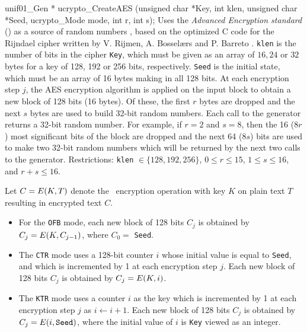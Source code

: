 unif01_Gen * ucrypto_CreateAES (unsigned char *Key, int klen,
                                unsigned char *Seed, ucrypto_Mode mode,
                                int r, int s);
\endcode
\tab Uses the \textit{Advanced Encryption standard} (\aes) as a source of
%
  random numbers \cite{rDAE02a,rNIS01a,rHEL03a,rBAR06a}, based on the optimized
  C code for the Rijndael cipher written by V. Rijmen,
  A. Bossel\ae rs and P. Barreto \cite{rRIJ00a}. \texttt{klen} is the number of
  bits in the cipher \texttt{Key}, which must be given as an array of $16, 24$
  or $32$ bytes for a key of 128, 192 or 256 bits, respectively. \texttt{Seed}
  is the initial state, which must be an array of 16 bytes making in all 128 bits.
  At each encryption step $j$, the AES encryption algorithm is applied on the
  input block to obtain a new block of 128 bits (16 bytes). Of these,
  the first $r$ bytes are dropped and the next $s$ bytes are used to build 32-bit
  random numbers. Each call to the generator returns a 32-bit random number.
  For example, if $r=2$ and $s=8$, then the 16 ($8r$) most significant bits of
  the block are dropped and the next 64 ($8s$) bits are used to make two 32-bit
  random numbers which will be returned by the next two calls to the
  generator. Restrictions: \texttt{klen} $\in \{ 128, 192, 256\}$,
  $0 \le r \le 15$, $1 \le s \le 16$, and  $r + s \le 16$.

  Let $C = {E}(K,T)$ denote the \aes\ encryption operation with key $K$ on
  plain text $T$ resulting in encrypted text $C$.
\begin{itemize}

\item  For the \texttt{OFB} mode, each new block of 128 bits $C_j$ is
  obtained by $C_j = {E}(K,C_{j-1})$, where $C_0 =$ \texttt{Seed}.

\item The \texttt{CTR} mode uses a 128-bit counter $i$ whose initial value is
  equal to \texttt{Seed}, and which is incremented
  by 1 at each encryption step $j$. Each new block of 128 bits
  $C_j$ is obtained by $C_j = {E}(K,i)$.

\item The \texttt{KTR} mode uses a counter $i$ as the key which is
  incremented by 1 at each encryption step $j$ as $i \leftarrow i + 1$.
  Each new block of 128 bits $C_j$ is obtained by
  $C_j = {E}(i, \texttt{Seed})$, where the initial value of $i$ is
 \texttt{Key} viewed as an integer.
\end{itemize}
 \endtab
\code


